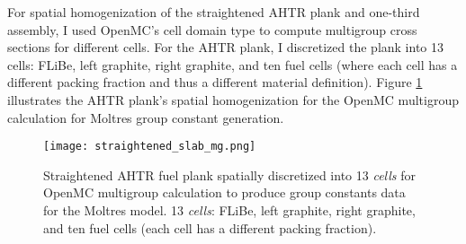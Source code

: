 For spatial homogenization of the straightened \gls{AHTR} plank and 
one-third assembly, I used OpenMC's cell domain type to compute 
multigroup cross sections for different cells. 
For the \gls{AHTR} plank, I discretized the plank into 13 cells:
FLiBe, left graphite, right graphite, and ten fuel cells (where each cell has a 
different packing fraction and thus a different material definition).
Figure \ref{fig:straightened_slab_mg} illustrates the \gls{AHTR} plank's spatial 
homogenization for the OpenMC multigroup calculation for Moltres group constant 
generation. 
\begin{figure}[htbp]
    \centering
    \texttt{[image: straightened\_slab\_mg.png]}
    \raggedright
    \caption{Straightened \acrfull{AHTR} fuel plank spatially discretized into 
    13 \textit{cells} for OpenMC multigroup calculation to produce group constants 
    data for the Moltres model. 13 \textit{cells}:
    FLiBe, left graphite, right graphite, and ten fuel cells (each cell has a different 
    packing fraction).}
    \label{fig:straightened_slab_mg}
\end{figure}


